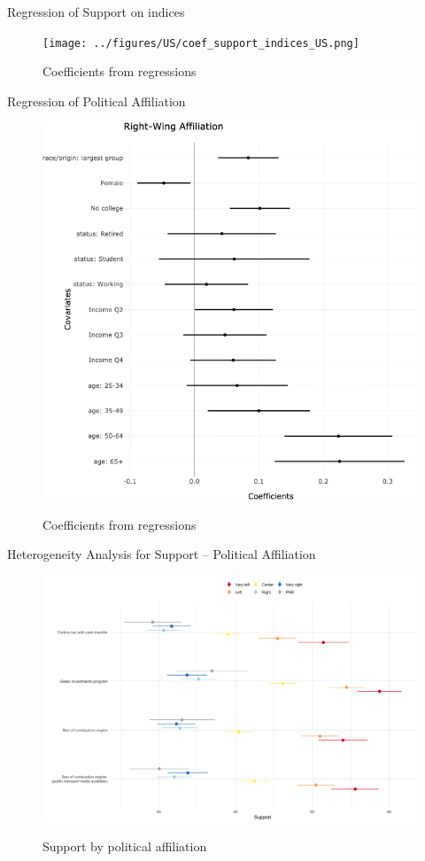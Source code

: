 \documentclass[aspectratio=169,9pt,dvipsnames]{beamer}
\begin{document}
\begin{frame}{Regression of Support on indices}%
\vspace{-.5cm}
\begin{figure}[h!]
\caption{Coefficients from regressions}
\texttt{[image: ../figures/US/coef\_support\_indices\_US.png]} \\
\end{figure}
\end{frame}

\begin{frame}{Regression of Political Affiliation}%
\vspace{-.5cm}
\begin{figure}[h!]
\caption{Coefficients from regressions}
\includegraphics[width=.5\textwidth]{../figures/US/coef_Right_US.png} \\
\end{figure}
\end{frame}

\begin{frame}{Heterogeneity Analysis for Support -- Political Affiliation}%
\vspace{-.5cm}
\begin{figure}[h!]
\caption{Support by political affiliation}
\includegraphics[width=.7\textwidth]{../figures/US/support_by_political_US.png} \\
\end{figure}
\end{frame}
\end{document}
